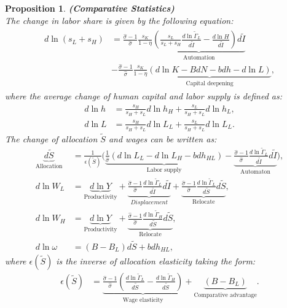 \documentclass[12pt]{article}
\newtheorem{proposition}{Proposition}
\begin{document}
\begin{proposition}{\bf (Comparative Statistics)} \\
The change in labor share is given by the following equation: 
\begin{align}
\label{ds_L}
\begin{split}
d\ln(s_{L}+s_{H}) &= \frac{\hat{\sigma}-1}{\hat{\sigma}}\frac{s_K}{1-\eta}\underbrace{( \frac{s_L}{s_L+s_H}\frac{d\ln\tilde{\Gamma}_L}{d\tilde{I}}-\frac{d\ln H}{d\tilde{I}})d\tilde{I}}_{\text{Automation}}\\
&-\frac{\hat{\sigma}-1}{\hat{\sigma}}\frac{s_K}{1-\eta}\underbrace{(d\ln K -BdN-bdh-d\ln L)}_{\text{Capital deepening}},
 \end{split}
\end{align}
where the average change of human capital and labor supply is defined as: 
\begin{align*}
d\ln h &= \frac{s_H}{s_H+s_L}d\ln h_H+\frac{s_L}{s_H+s_L}d\ln h_L,\\
d\ln L &= \frac{s_H}{s_H+s_L}d\ln L_L+\frac{s_L}{s_H+s_L}d\ln L_L.
\end{align*}
The change of allocation $\tilde{S}$ and wages can be written as: 
\begin{align}
\label{dS}
\underbrace{d\tilde{S}}_{\text{Allocation}} &= \frac{1}{\epsilon(\tilde{S})}\Big(\underbrace{\frac{1}{\hat{\sigma}}(d\ln L_L-d\ln L_H-bdh_{HL})}_{\text{Labor supply}}-\underbrace{\frac{\hat{\sigma}-1}{\hat{\sigma}}\frac{d\ln\tilde{\Gamma}_L}{d\tilde{I}}d\tilde{I}}_{\text{Automaton}}\Big),\\ 
\label{dW_L}
d \ln W_L &= \underbrace{d \ln Y}_{\text{Productivity}} + \underbrace{\frac{\hat{\sigma}-1}{\hat{\sigma}}\frac{d\ln\tilde{\Gamma}_L}{d\tilde{I}}d\tilde{I}}_{Displacement}+ \underbrace{\frac{\hat{\sigma}-1}{\hat{\sigma}}\frac{d\ln\tilde{\Gamma}_L}{d\tilde{S}}d\tilde{S}}_{\text{Relocate}},\\
\label{dW_H}
d \ln W_H &= \underbrace{d \ln Y}_{\text{Productivity}}  + \underbrace{\frac{\hat{\sigma}-1}{\hat{\sigma}}\frac{d\ln\tilde{\Gamma}_H}{d\tilde{S}}d\tilde{S}}_{\text{Relocate}}, \\
\label{dw}
d \ln \omega &=(B-B_L)d\tilde{S}+bdh_{HL},
\end{align}
where $\epsilon(\tilde{S})$ is the inverse of allocation elasticity taking the form:  
\begin{align}
\label{eS}
\epsilon(\tilde{S})&= \underbrace{\frac{\hat{\sigma}-1}{\hat{\sigma}}(\frac{d\ln \tilde{\Gamma}_L}{d\tilde{S}}-\frac{d\ln \tilde{\Gamma}_H}{d\tilde{S}})}_{\text{Wage elasticity}}
								 +\underbrace{(B-B_L)}_{\text{Comparative advantage}}.
\end{align}
\end{proposition}
\end{document}
